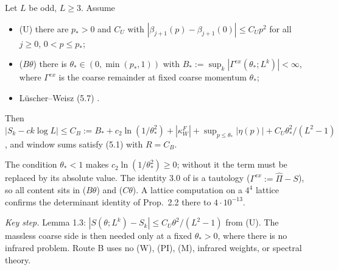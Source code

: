 \begin{theorem}\label{thm:L010}
Let $L$ be odd, $L\ge3$. Assume
\begin{itemize}
\item (U) there are $p_*>0$ and $C_U$ with $|\beta_{j+1}(p)-\beta_{j+1}(0)|\le C_Up^2$ for all $j\ge0$, $0<p\le p_*$;
\item ($B\theta$) there is $\theta_*\in(0,\min(p_*,1))$ with $B_*:=\sup_k|\Gamma^{ex}(\theta_*;L^k)|<\infty$, where $\Gamma^{ex}$ is the coarse remainder at fixed coarse momentum $\theta_*$;
\item L\"uscher--Weisz (5.7) \cite{luscherweisz1995}.
\end{itemize}
Then $|S_k-ck\log L|\le C_B:=B_*+c_2\ln(1/\theta_*^2)+|\kappa_W^F|+\sup_{p\le\theta_*}|\eta(p)|+C_U\theta_*^2/(L^2-1)$, and window sums satisfy (5.1) with $R=C_B$.
\end{theorem}
The condition $\theta_*<1$ makes $c_2\ln(1/\theta_*^2)\ge0$; without it the term must be replaced by its absolute value. The identity 3.0 of  is a tautology ($\Gamma^{ex}:=\hat\Pi-S$), so all content sits in ($B\theta$) and ($C\theta$). A lattice computation on a $4^4$ lattice confirms the determinant identity of Prop.\ 2.2 there to $4\cdot10^{-13}$.

\emph{Key step.} Lemma 1.3: $|S(\theta;L^k)-S_k|\le C_U\theta^2/(L^2-1)$ from (U). The massless coarse side is then needed only at a fixed $\theta_*>0$, where there is no infrared problem. Route B uses no (W), (PI), (M), infrared weights, or spectral theory.

